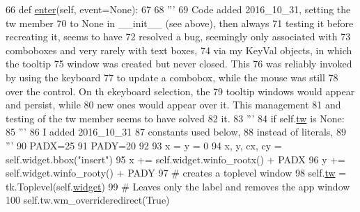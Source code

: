 \begin{DoxyCode}
66     \textcolor{keyword}{def }\hyperlink{classnegui_1_1createtooltip_1_1CreateToolTip_ab37624e73833e8ba485d10410c5986bb}{enter}(self, event=None):
67 
68         \textcolor{stringliteral}{'''}
69 \textcolor{stringliteral}{        Code added 2016\_10\_31, setting the tw member }
70 \textcolor{stringliteral}{        to None in \_\_init\_\_ (see above), then always }
71 \textcolor{stringliteral}{        testing it before recreating it, seems to have}
72 \textcolor{stringliteral}{        resolved a bug, seemingly only associated with}
73 \textcolor{stringliteral}{        comboboxes and very rarely with text boxes,}
74 \textcolor{stringliteral}{        via my KeyVal objects, in which the tooltip}
75 \textcolor{stringliteral}{        window was created but never closed.  This}
76 \textcolor{stringliteral}{        was reliably invoked by using the keyboard}
77 \textcolor{stringliteral}{        to update a combobox, while the mouse was still}
78 \textcolor{stringliteral}{        over the control. On th ekeyboard selection, the}
79 \textcolor{stringliteral}{        tooltip windows would appear and persist, while}
80 \textcolor{stringliteral}{        new ones would appear over it.  This management}
81 \textcolor{stringliteral}{        and testing of the tw member seems to have solved}
82 \textcolor{stringliteral}{        it.}
83 \textcolor{stringliteral}{        '''}
84         \textcolor{keywordflow}{if} self.\hyperlink{classnegui_1_1createtooltip_1_1CreateToolTip_ac47a0f82a5a354f6c8914c4631d1a0cf}{tw} \textcolor{keywordflow}{is} \textcolor{keywordtype}{None}:
85             \textcolor{stringliteral}{'''}
86 \textcolor{stringliteral}{            I added 2016\_10\_31}
87 \textcolor{stringliteral}{            constants used below,}
88 \textcolor{stringliteral}{            instead of literals,}
89 \textcolor{stringliteral}{            '''} 
90             PADX=25
91             PADY=20
92 
93             x = y = 0
94             x, y, cx, cy = self.widget.bbox(\textcolor{stringliteral}{"insert"})
95             x += self.widget.winfo\_rootx() + PADX
96             y += self.widget.winfo\_rooty() + PADY
97             \textcolor{comment}{# creates a toplevel window}
98             self.\hyperlink{classnegui_1_1createtooltip_1_1CreateToolTip_ac47a0f82a5a354f6c8914c4631d1a0cf}{tw} = tk.Toplevel(self.\hyperlink{classnegui_1_1createtooltip_1_1CreateToolTip_a6619448e568b135261fd02a6d9b36725}{widget})
99             \textcolor{comment}{# Leaves only the label and removes the app window}
100             self.tw.wm\_overrideredirect(\textcolor{keyword}{True})

\end{DoxyCode}
